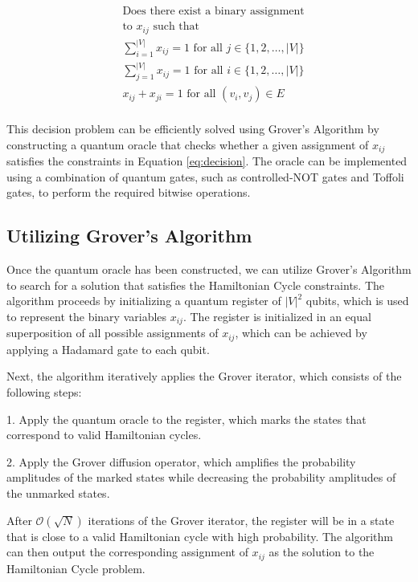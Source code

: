\begin{equation}\label{eq:decision}
\begin{split}
& \text{Does there exist a binary assignment} \\
& \text{to } x_{ij} \text{ such that} \\
& \sum_{i=1}^{|V|} x_{ij} = 1 \text{ for all } j \in \{1, 2, \dots, |V|\} \\
& \sum_{j=1}^{|V|} x_{ij} = 1 \text{ for all } i \in \{1, 2, \dots, |V|\} \\
& x_{ij} + x_{ji} = 1 \text{ for all } (v_i, v_j) \in E \\
\end{split}
\end{equation}

This decision problem can be efficiently solved using Grover's Algorithm by constructing a quantum oracle that checks whether a given assignment of $x_{ij}$ satisfies the constraints in Equation \eqref{eq:decision}. The oracle can be implemented using a combination of quantum gates, such as controlled-NOT gates and Toffoli gates, to perform the required bitwise operations.

\subsection{Utilizing Grover's Algorithm}\label{subsec:grovers}

Once the quantum oracle has been constructed, we can utilize Grover's Algorithm to search for a solution that satisfies the Hamiltonian Cycle constraints. The algorithm proceeds by initializing a quantum register of $|V|^2$ qubits, which is used to represent the binary variables $x_{ij}$. The register is initialized in an equal superposition of all possible assignments of $x_{ij}$, which can be achieved by applying a Hadamard gate to each qubit.

Next, the algorithm iteratively applies the Grover iterator, which consists of the following steps:

1. Apply the quantum oracle to the register, which marks the states that correspond to valid Hamiltonian cycles.

2. Apply the Grover diffusion operator, which amplifies the probability amplitudes of the marked states while decreasing the probability amplitudes of the unmarked states.

After $\mathcal{O}(\sqrt{N})$ iterations of the Grover iterator, the register will be in a state that is close to a valid Hamiltonian cycle with high probability. The algorithm can then output the corresponding assignment of $x_{ij}$ as the solution to the Hamiltonian Cycle problem.

